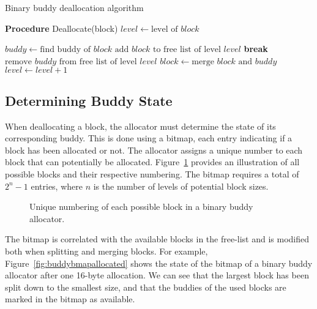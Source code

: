 \begin{algorithm}[h]
    \caption{Binary buddy deallocation algorithm}
    \label{alg:bbuddy_dealloc}
    \begin{algorithmic}[1]
        \Statex \textbf{Procedure} Deallocate(block)
        \State $level \gets \text{level of } block$

        \State $buddy \gets \text{find buddy of } block$
        \State $\text{add } block \text{ to free list of level } level$
        \State \textbf{break}
        \Else
        \State $\text{remove } buddy \text{ from free list of level } level$
        \State $block \gets \text{merge } block \text{ and } buddy$
        \State $level \gets level + 1$
        \EndIf
        \EndWhile
    \end{algorithmic}
\end{algorithm}
\FloatBarrier

\subsection{Determining Buddy State}
When deallocating a block, the allocator must determine the state of its corresponding buddy. This is done using a bitmap, each entry indicating if a block has been allocated or not. The allocator assigns a unique number to each block that can potentially be allocated. Figure~\ref{fig:buddyorder} provides an illustration of all possible blocks and their respective numbering. The bitmap requires a total of $2^n - 1$ entries, where $n$ is the number of levels of potential block sizes.

\begin{figure}[h]
    \centering
    
    \caption{Unique numbering of each possible block in a binary buddy allocator.}
    \label{fig:buddyorder}
\end{figure}
The bitmap is correlated with the available blocks in the free-list and is modified both when splitting and merging blocks. For example, Figure~\ref{fig:buddybmapallocated} shows the state of the bitmap of a binary buddy allocator after one 16-byte allocation. We can see that the largest block has been split down to the smallest size, and that the buddies of the used blocks are marked in the bitmap as available.


